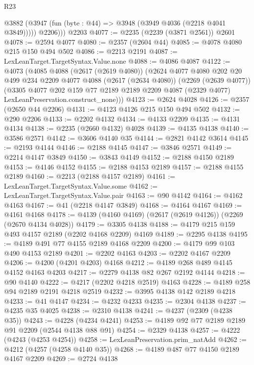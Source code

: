 \begin{lexlean}{R23}
\begin{coremodule}
        @3882 (@3947 (fun (byte : @44) => @3948 (@3949 @4036 (@2218 @4041 @3849)))))
          @2206)))
    @2203
@4077 := @2235 (@2239 (@3871 @2561)) @2601
@4078 := @2594 @4077
@4080 := @2357 (@2604 @44)
@4085 := @4078 @4080 @215 @150 @494 @502
@4086 := @2213 @2191
@4087 := LexLeanTarget.TargetSyntax.Value.none
@4088 := @4086 @4087
@4122 := @4073
    (@4085
      @4088
      (@2617 (@2619 @4080))
      (@2624
        @4077
        @4080
        @202
        @20
        @499
        @234
        @2209
        @4077
        @4088
        (@2617 (@2634 @4080))
        (@2269 (@2639 @4077))
        (@3305
          @4077
          @202
          @159
          @77
          @2189
          @2189
          @2209
          @4087
          (@2329 @4077)
          LexLeanPreservation.construct_none)))
@4123 := @2624 @4028
@4126 := @2357 (@2650 @44 @2206)
@4131 := @4123 @4126 @215 @150 @494 @502
@4132 := @290 @2206
@4133 := @2202 @4132
@4134 := @4133 @2209
@4135 := @4131 @4134
@4138 := @2235 (@2660 @4132) @4028
@4139 := @4135 @4138
@4140 := @3586 @2571
@4142 := @3606 @4140 @35
@4144 := @2821 @4142 @3614
@4145 := @2193 @4144
@4146 := @2188 @4145
@4147 := @3846 @2571
@4149 := @2214 @4147 @3849
@4150 := @3843 @4149
@4152 := @2188 @4150 @2189
@4153 := @4146 @4152
@4155 := @2188 @4153 @2189
@4157 := @2188 @4155 @2189
@4160 := @2213 (@2188 @4157 @2189)
@4161 := LexLeanTarget.TargetSyntax.Value.some
@4162 := LexLeanTarget.TargetSyntax.Value.pair
@4163 := @90 @4142
@4164 := @4162 @4163
@4167 := @41 (@2218 @4147 @3849)
@4168 := @4164 @4167
@4169 := @4161 @4168
@4178 := @4139 (@4160 @4169) (@2617 (@2619 @4126)) (@2269 (@2670 @4134 @4028))
@4179 := @3305 @4138
@4188 := @4179 @215 @159 @493 @4157 @2189 (@2202 @4168 @2209) @4169
@4189 := @2295 @4138
@4195 := @4189 @491 @77 @4155 @2189 @4168 @2209
@4200 := @4179 @99 @103 @490 @4153 @2189
@4201 := @2202 @4163
@4203 := @2202 @4167 @2209
@4206 := @4200 (@4201 @4203) @4168
@4212 := @4189 @268 @489 @4145 @4152 @4163 @4203
@4217 := @2279 @4138 @82 @267 @2192 @4144
@4218 := @90 @4140
@4222 := @4217 (@2202 @4218 @2519) @4163
@4228 := @4189 @258 @94 @2189 @2191 @4218 @2519
@4232 := @3995 @4138 @142 @2189 @4218
@4233 := @41 @4147
@4234 := @4232 @4233
@4235 := @2304 @4138
@4237 := @4235 @35 @4025
@4238 := @2310 @4138
@4241 := @4237 (@2309 (@4238 @35))
@4243 := @4228 (@4234 @4241)
@4253 := @4189 @92 @77 @2189 @2189 @91 @2209 (@2544 @4138 @88 @91)
@4254 := @2329 @4138
@4257 := @4222 (@4243 (@4253 @4254))
@4258 := LexLeanPreservation.prim_natAdd
@4262 := @4212 (@4257 (@4258 @4140 @35))
@4268 := @4189 @487 @77 @4150 @2189 @4167 @2209
@4269 := @2724 @4138

\end{coremodule}
\end{lexlean}
